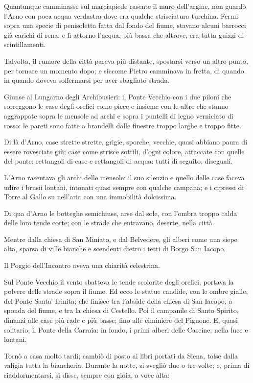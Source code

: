 Quantunque camminasse sul marciapiede rasente il muro dell’argine, non guardò l’Arno con poca acqua verdastra dove era qualche strisciatura turchina. Fermi sopra una specie di penisoletta fatta dal fondo del fiume, stavano alcuni barrocci già carichi di rena; e lì attorno l’acqua, più bassa che altrove, era tutta guizzi di scintillamenti.

Talvolta, il rumore della città pareva più distante, spostarsi verso un altro punto, per tornare un momento dopo; e siccome Pietro camminava in fretta, di quando in quando doveva soffermarsi per aver sbagliato strada.

Giunse al Lungarno degli Archibusieri: il Ponte Vecchio con i due piloni che sorreggono le case degli orefici come picce e insieme con le altre che stanno aggrappate sopra le mensole ad archi e sopra i puntelli di legno verniciato di rosso: le pareti sono fatte a brandelli dalle finestre troppo larghe e troppo fitte.

Di là d’Arno, case strette strette, grigie, sporche, vecchie, quasi abbiano paura di essere rovesciate giù; case come strisce sottili, d’ogni colore, attaccate con quelle del ponte; rettangoli di case e rettangoli di acqua: tutti di seguito, diseguali.

L’Arno rasentava gli archi delle mensole: il suo silenzio e quello delle case faceva udire i brusii lontani, intonati quasi sempre con qualche campana; e i cipressi di Torre al Gallo su nell’aria con una immobilità dolcissima.

Di qua d’Arno le botteghe semichiuse, arse dal sole, con l’ombra troppo calda delle loro tende corte; con le strade che entravano, deserte, nella città.

Mentre dalla chiesa di San Miniato, e dal Belvedere, gli alberi come una siepe alta, sparsa di ville bianche e scendenti dietro i tetti di Borgo San Iacopo.

Il Poggio dell’Incontro aveva una chiarità celestrina.

Sul Ponte Vecchio il vento sbatteva le tende scolorite degli orefici, portava la polvere delle strade sopra il fiume. Ed ecco le statue candide, con le ombre gialle, del Ponte Santa Trinita; che finisce tra l’abside della chiesa di San Iacopo, a sponda del fiume, e tra la chiesa di Cestello. Poi il campanile di Santo Spirito, dinanzi alle case più rade e più basse; fino alle ciminiere del Pignone. E, quasi solitario, il Ponte della Carraia: in fondo, i primi alberi delle Cascine; nella luce e lontani.

Tornò a casa molto tardi; cambiò di posto ai libri portati da Siena, tolse dalla valigia tutta la biancheria. Durante la notte, si svegliò due o tre volte; e, prima di riaddormentarsi, sì disse, sempre con gioia, a voce alta:

